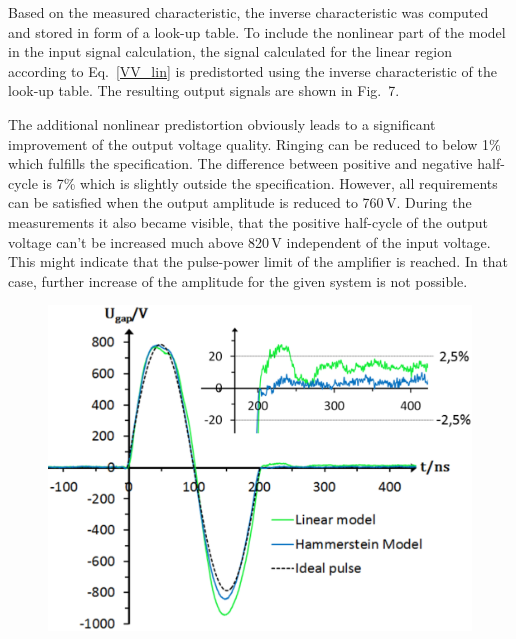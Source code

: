 \documentclass[a4paper,
              ]{jacow}
\begin{document}
	Based on the measured characteristic, the inverse characteristic was computed and stored in form of a look-up table. To include the nonlinear
	part of the model in the input signal calculation, the signal calculated for the linear region according to Eq.~\eqref{VV_lin} is predistorted
	using the inverse characteristic of the look-up table. The resulting output signals are shown in Fig.~7.

	 The additional nonlinear predistortion obviously leads to a significant improvement of the output voltage quality. Ringing
	 can be reduced to below 1\% which fulfills the specification. The difference between positive and negative half-cycle is 7\% which is slightly 
	 outside the specification. However, all requirements can be satisfied when the output amplitude is reduced to 760\,V.
	 During the measurements it also became visible, that the positive half-cycle of the output voltage can't be increased much above 820\,V independent of the input
	 voltage. This might indicate that the pulse-power limit of the amplifier is reached. In that case, further increase of the amplitude for the given
	 system is not possible.
	 	
	\begin{figure}[h]
       \vspace*{-.5\baselineskip}
	\begin{center}
	 \includegraphics[scale=0.36]{WEPVA047f7.eps}
	 \label{Vergleich}
	 \end{center}	 
	 \vspace*{-\baselineskip}
	\end{figure} 
	
\end{document}
